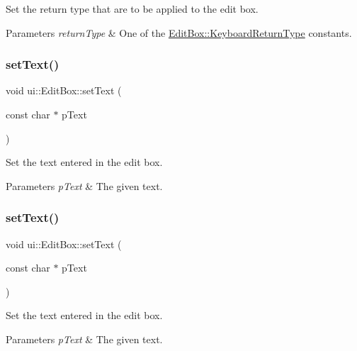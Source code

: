 Set the return type that are to be applied to the edit box. 
\begin{DoxyParams}{Parameters}
{\em return\+Type} & One of the \hyperlink{classui_1_1EditBox_a1e1285b6f742975b26bdeb8108ca6e51}{Edit\+Box\+::\+Keyboard\+Return\+Type} constants. \\
\hline
\end{DoxyParams}
\mbox{\label{classui_1_1EditBox_aab808bfc3f2e2ab7553f23b35002dfb7}} 
\subsubsection{\texorpdfstring{set\+Text()}{setText()}\hspace{0.1cm}{\footnotesize\ttfamily [1/2]}}
{\footnotesize\ttfamily void ui\+::\+Edit\+Box\+::set\+Text (\begin{DoxyParamCaption}\item[{const char $\ast$}]{p\+Text }\end{DoxyParamCaption})}

Set the text entered in the edit box. 
\begin{DoxyParams}{Parameters}
{\em p\+Text} & The given text. \\
\hline
\end{DoxyParams}
\mbox{\label{classui_1_1EditBox_aab808bfc3f2e2ab7553f23b35002dfb7}} 
\subsubsection{\texorpdfstring{set\+Text()}{setText()}\hspace{0.1cm}{\footnotesize\ttfamily [2/2]}}
{\footnotesize\ttfamily void ui\+::\+Edit\+Box\+::set\+Text (\begin{DoxyParamCaption}\item[{const char $\ast$}]{p\+Text }\end{DoxyParamCaption})}

Set the text entered in the edit box. 
\begin{DoxyParams}{Parameters}
{\em p\+Text} & The given text. \\
\hline
\end{DoxyParams}
\mbox{\label{classui_1_1EditBox_afc334fb2759ea97216ee10f501a7e988}} 
